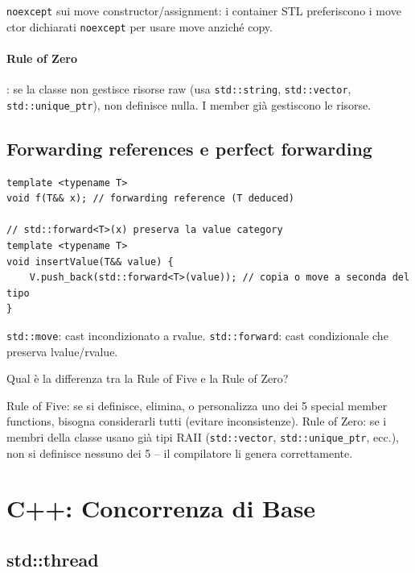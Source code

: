 \documentclass[11pt,a4paper]{article}
\theoremstyle{remark}
\newenvironment{esercizio}[1][]{%
  \begin{tcolorbox}[breakable,title={\textbf{Esercizio / Domanda d'esame}\ifx&#1&\else: #1\fi},
    colback=yellow!5!white, colframe=orange!75!black, fonttitle=\small\bfseries]%
}{%
  \end{tcolorbox}%
}
\newenvironment{risposta}{%
  \begin{tcolorbox}[breakable,title={\textbf{Risposta}},
    colback=green!5!white, colframe=green!50!black, fonttitle=\small\bfseries]%
}{%
  \end{tcolorbox}%
}
\begin{document}
\texttt{noexcept} sui move constructor/assignment: i container STL preferiscono i move ctor dichiarati \texttt{noexcept} per usare move anziché copy.

\paragraph{Rule of Zero}: se la classe non gestisce risorse raw (usa \texttt{std::string}, \texttt{std::vector}, \texttt{std::unique\_ptr}), non definisce nulla. I member già gestiscono le risorse.

\subsection{Forwarding references e perfect forwarding}

\begin{lstlisting}
template <typename T>
void f(T&& x); // forwarding reference (T deduced)

// std::forward<T>(x) preserva la value category
template <typename T>
void insertValue(T&& value) {
    V.push_back(std::forward<T>(value)); // copia o move a seconda del tipo
}
\end{lstlisting}

\texttt{std::move}: cast incondizionato a rvalue. \texttt{std::forward}: cast condizionale che preserva lvalue/rvalue.

\begin{esercizio}
Qual è la differenza tra la Rule of Five e la Rule of Zero?
\end{esercizio}
\begin{risposta}
Rule of Five: se si definisce, elimina, o personalizza uno dei 5 special member functions, bisogna considerarli tutti (evitare inconsistenze). Rule of Zero: se i membri della classe usano già tipi RAII (\texttt{std::vector}, \texttt{std::unique\_ptr}, ecc.), non si definisce nessuno dei 5 -- il compilatore li genera correttamente.
\end{risposta}

\section{C++: Concorrenza di Base}

\subsection{std::thread}
\end{document}
